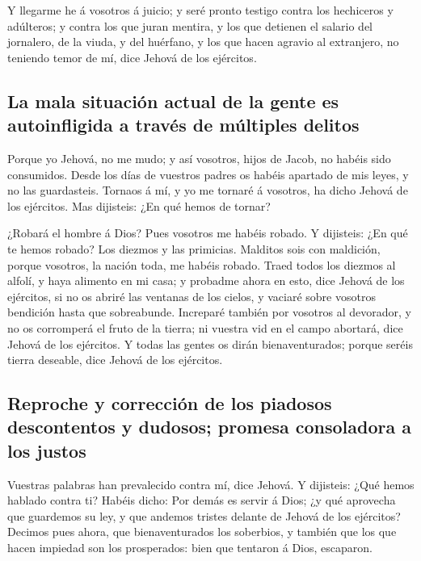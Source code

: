  Y llegarme he á vosotros á juicio; y seré pronto testigo
contra los hechiceros y adúlteros; y contra los que juran mentira, y los
que detienen el salario del jornalero, de la viuda, y del huérfano, y
los que hacen agravio al extranjero, no teniendo temor de mí, dice
Jehová de los ejércitos.

\hypertarget{la-mala-situaciuxf3n-actual-de-la-gente-es-autoinfligida-a-travuxe9s-de-muxfaltiples-delitos}{%
\subsection{La mala situación actual de la gente es autoinfligida a
través de múltiples
delitos}\label{la-mala-situaciuxf3n-actual-de-la-gente-es-autoinfligida-a-travuxe9s-de-muxfaltiples-delitos}}

 Porque yo Jehová, no me mudo; y así vosotros, hijos de
Jacob, no habéis sido consumidos.  Desde los días de
vuestros padres os habéis apartado de mis leyes, y no las guardasteis.
Tornaos á mí, y yo me tornaré á vosotros, ha dicho Jehová de los
ejércitos. Mas dijisteis: ¿En qué hemos de tornar?

 ¿Robará el hombre á Dios? Pues vosotros me habéis robado.
Y dijisteis: ¿En qué te hemos robado? Los diezmos y las primicias.
 Malditos sois con maldición, porque vosotros, la nación
toda, me habéis robado.  Traed todos los diezmos al
alfolí, y haya alimento en mi casa; y probadme ahora en esto, dice
Jehová de los ejércitos, si no os abriré las ventanas de los cielos, y
vaciaré sobre vosotros bendición hasta que sobreabunde. 
Increparé también por vosotros al devorador, y no os corromperá el fruto
de la tierra; ni vuestra vid en el campo abortará, dice Jehová de los
ejércitos.  Y todas las gentes os dirán bienaventurados;
porque seréis tierra deseable, dice Jehová de los ejércitos.

\hypertarget{reproche-y-correcciuxf3n-de-los-piadosos-descontentos-y-dudosos-promesa-consoladora-a-los-justos}{%
\subsection{Reproche y corrección de los piadosos descontentos y
dudosos; promesa consoladora a los
justos}\label{reproche-y-correcciuxf3n-de-los-piadosos-descontentos-y-dudosos-promesa-consoladora-a-los-justos}}

 Vuestras palabras han prevalecido contra mí, dice
Jehová. Y dijisteis: ¿Qué hemos hablado contra ti? 
Habéis dicho: Por demás es servir á Dios; ¿y qué aprovecha que guardemos
su ley, y que andemos tristes delante de Jehová de los ejércitos?
 Decimos pues ahora, que bienaventurados los soberbios, y
también que los que hacen impiedad son los prosperados: bien que
tentaron á Dios, escaparon.

